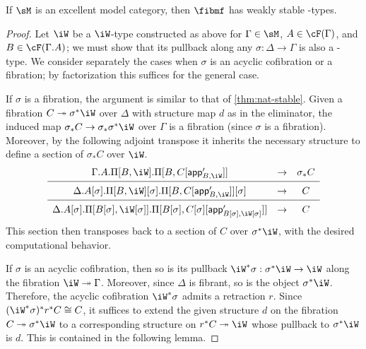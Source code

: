 \documentclass{amsart}
\let\W\iW
\let\F\cF
\begin{document}
\begin{thm}
  If $\sM$ is an excellent model category, then $\fibmf$ has weakly stable \W-types.
\end{thm}
\begin{proof}
  Let $\W$ be a $\W$-type constructed as above for $\Gamma\in\sM$, $A\in\F(\Gamma)$, and $B\in\F(\Gamma.A)$; we must show that its pullback along any $\sigma:\Delta\to\Gamma$ is also a \W-type.
  We consider separately the cases when $\sigma$ is an acyclic cofibration or a fibration; by factorization this suffices for the general case.

  If $\sigma$ is a fibration, the argument is similar to that of \cref{thm:nat-stable}.
  Given a fibration $C\fib \sigma^*\W$ over $\Delta$ with structure map $d$ as in the eliminator, the induced map $\sigma_* C \to \sigma_* \sigma^* \W$ over $\Gamma$ is a fibration (since $\sigma$ is a fibration).
  Moreover, by the following adjoint transpose it inherits the necessary structure to define a section of $\sigma_* C$ over $\W$.
  \[
  \begin{array}{ccc}
    \Gamma.A.\Pi[B,\W].\Pi[B,C[\mathsf{app}'_{B,\W}]] &\to& \sigma_* C \\\hline
    \Delta.A[\sigma].\Pi[B,\W][\sigma].\Pi[B,C[\mathsf{app}'_{B,\W}]][\sigma] &\to& C \\\hline
    \Delta.A[\sigma].\Pi[B[\sigma],\W[\sigma]].\Pi[B[\sigma],C[\sigma][\mathsf{app}'_{B[\sigma],\W[\sigma]}]] &\to& C
  \end{array}
  \]
  This section then transposes back to a section of $C$ over $\sigma^*\W$, with the desired computational behavior.

  If $\sigma$ is an acyclic cofibration, then so is its pullback $\W^*\sigma : \sigma^*\W \to \W$ along the fibration $\W\fib\Gamma$.
  Moreover, since $\Delta$ is fibrant, so is the object $\sigma^*\W$.
  Therefore, the acyclic cofibration $\W^*\sigma$ admits a retraction $r$.
  Since $(\W^*\sigma)^* r^* C \cong C$, it suffices to extend the given structure $d$ on the fibration $C\fib\sigma^*\W$ to a corresponding structure on $r^* C\fib\W$ whose pullback to $\sigma^*\W$ is $d$.
  This is contained in the following lemma.
\end{proof}
\end{document}
